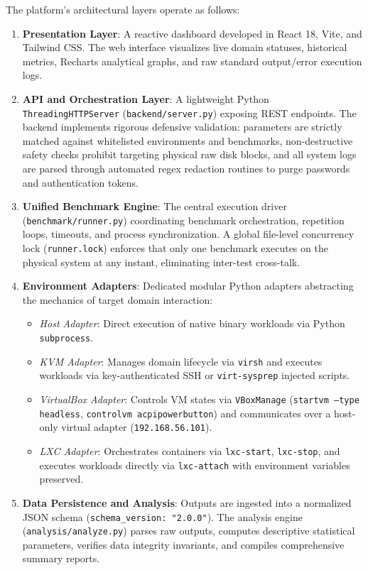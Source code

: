 The platform's architectural layers operate as follows:
\begin{enumerate}
    \item \textbf{Presentation Layer}: A reactive dashboard developed in React 18, Vite, and Tailwind CSS. The web interface visualizes live domain statuses, historical metrics, Recharts analytical graphs, and raw standard output/error execution logs.
    \item \textbf{API and Orchestration Layer}: A lightweight Python \texttt{ThreadingHTTPServer} (\texttt{backend/server.py}) exposing REST endpoints. The backend implements rigorous defensive validation: parameters are strictly matched against whitelisted environments and benchmarks, non-destructive safety checks prohibit targeting physical raw disk blocks, and all system logs are parsed through automated regex redaction routines to purge passwords and authentication tokens.
    \item \textbf{Unified Benchmark Engine}: The central execution driver (\texttt{benchmark/runner.py}) coordinating benchmark orchestration, repetition loops, timeouts, and process synchronization. A global file-level concurrency lock (\texttt{runner.lock}) enforces that only one benchmark executes on the physical system at any instant, eliminating inter-test cross-talk.
    \item \textbf{Environment Adapters}: Dedicated modular Python adapters abstracting the mechanics of target domain interaction:
    \begin{itemize}
        \item \textit{Host Adapter}: Direct execution of native binary workloads via Python \texttt{subprocess}.
        \item \textit{KVM Adapter}: Manages domain lifecycle via \texttt{virsh} and executes workloads via key-authenticated SSH or \texttt{virt-sysprep} injected scripts.
        \item \textit{VirtualBox Adapter}: Controls VM states via \texttt{VBoxManage} (\texttt{startvm --type headless}, \texttt{controlvm acpipowerbutton}) and communicates over a host-only virtual adapter (\texttt{192.168.56.101}).
        \item \textit{LXC Adapter}: Orchestrates containers via \texttt{lxc-start}, \texttt{lxc-stop}, and executes workloads directly via \texttt{lxc-attach} with environment variables preserved.
    \end{itemize}
    \item \textbf{Data Persistence and Analysis}: Outputs are ingested into a normalized JSON schema (\texttt{schema\_}\allowbreak\texttt{version: "2.0.0"}). The analysis engine (\texttt{analysis/}\allowbreak\texttt{analyze.py}) parses raw outputs, computes descriptive statistical parameters, verifies data integrity invariants, and compiles comprehensive summary reports.
\end{enumerate}


